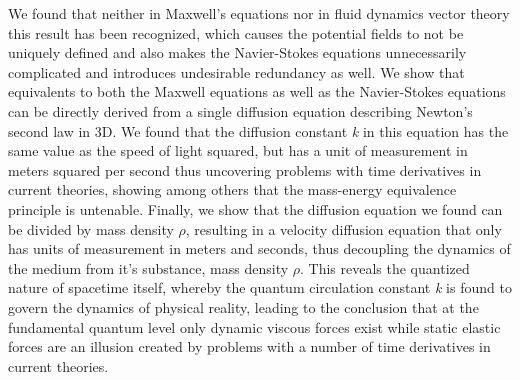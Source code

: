 \documentclass[a4paper]{article}
\begin{document}
{{We found that neither in Maxwell's equations nor in fluid dynamics vector theory
this result has been recognized, which causes the potential fields to not be
uniquely defined and also makes the Navier-Stokes equations unnecessarily
complicated and introduces undesirable redundancy as well. We show that
equivalents to both the Maxwell equations as well as the Navier-Stokes equations
can be directly derived from a single diffusion equation describing Newton's
second law in 3D. We found that the diffusion constant \textit{{k}} in this
equation has the same value as the speed of light squared, but has a unit of
measurement in meters squared per second thus uncovering problems with time
derivatives in current theories, showing among others that the mass-energy
equivalence principle is untenable. Finally, we show that the diffusion equation
we found can be divided by mass density $\rho $, resulting in a velocity
diffusion equation that only has units of measurement in meters and seconds,
thus decoupling the dynamics of the medium from it's substance, mass density
$\rho $. This reveals the quantized nature of spacetime itself, whereby the
quantum circulation constant }\textit{{k}}{ is found to govern the dynamics of
physical reality, leading to the conclusion that at the fundamental quantum
level only dynamic viscous forces exist while static elastic forces are an
illusion created by problems with a number of time derivatives in current
theories.}}
\end{document}
